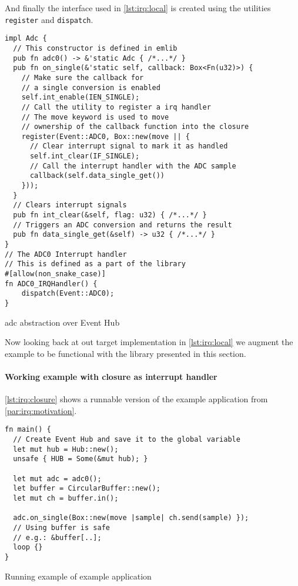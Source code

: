 And finally the interface used in \autoref{lst:irq:local} is created using the utilities \texttt{register} and \texttt{dispatch}.
\begin{listing}[H]
  \begin{verbatim}
impl Adc {
  // This constructor is defined in emlib
  pub fn adc0() -> &'static Adc { /*...*/ }
  pub fn on_single(&'static self, callback: Box<Fn(u32)>) {
    // Make sure the callback for
    // a single conversion is enabled
    self.int_enable(IEN_SINGLE);
    // Call the utility to register a irq handler
    // The move keyword is used to move
    // ownership of the callback function into the closure
    register(Event::ADC0, Box::new(move || {
      // Clear interrupt signal to mark it as handled
      self.int_clear(IF_SINGLE);
      // Call the interrupt handler with the ADC sample
      callback(self.data_single_get())
    }));
  }
  // Clears interrupt signals
  pub fn int_clear(&self, flag: u32) { /*...*/ }
  // Triggers an ADC conversion and returns the result
  pub fn data_single_get(&self) -> u32 { /*...*/ }
}
// The ADC0 Interrupt handler
// This is defined as a part of the library
#[allow(non_snake_case)]
fn ADC0_IRQHandler() {
    dispatch(Event::ADC0);
}
  \end{verbatim}
  \caption{\gls{adc} abstraction over Event Hub}
  \label{lst:adc-abstraction}
\end{listing}

Now looking back at out target implementation in \autoref{lst:irq:local} we augment the example to be functional with the library presented in this section.

\paragraph{Working example with closure as interrupt handler}

\autoref{lst:irq:closure} shows a runnable version of the example application from \autoref{par:irq:motivation}.

\begin{listing}[H]
  \begin{verbatim}
fn main() {
  // Create Event Hub and save it to the global variable
  let mut hub = Hub::new();
  unsafe { HUB = Some(&mut hub); }

  let mut adc = adc0();
  let buffer = CircularBuffer::new();
  let mut ch = buffer.in();

  adc.on_single(Box::new(move |sample| ch.send(sample) });
  // Using buffer is safe
  // e.g.: &buffer[..];
  loop {}
}
  \end{verbatim}
  \caption{Running example of example application}
  \label{lst:irq:closure}
\end{listing}

